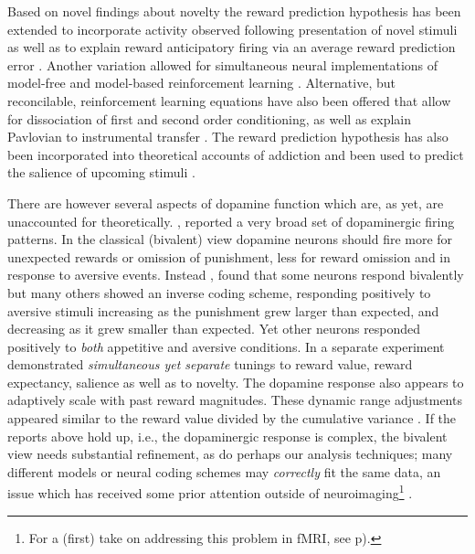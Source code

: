 Based on novel findings about novelty \cite{Bunzeck:2006p5319, Blatter:2006p6372, GuitartMasip:2010p7244} the reward prediction hypothesis has been extended to incorporate activity observed following presentation of novel stimuli \cite{Kakade:2002p6414} as well as to explain reward anticipatory firing via an average reward prediction error \cite{Knutson:2007p1687}. Another variation allowed for simultaneous neural implementations of model-free and model-based reinforcement learning \cite{Smith:2006p7627, Daw:2011p7995}. Alternative, but reconcilable, reinforcement learning equations have also been offered that allow for dissociation of first and second order conditioning, as well as explain Pavlovian to instrumental transfer \cite{OReilly:2007p827}. The reward prediction hypothesis has also been incorporated into theoretical accounts of addiction \cite{Redish:2004p2531} and been used to predict the salience of upcoming stimuli \cite{Behrens:2007p8839}.   

There are however several aspects of dopamine function which are, as yet, are unaccounted for theoretically.  , reported a very broad set of dopaminergic firing patterns. In the classical (bivalent) view dopamine neurons should fire more for unexpected rewards or omission of punishment, less for reward omission and in response to aversive events.   Instead , found that some neurons respond bivalently but many others showed an inverse coding scheme, responding positively to aversive stimuli increasing as the punishment grew larger than expected, and decreasing as it grew smaller than expected.  Yet other neurons responded positively to \emph{both} appetitive and aversive conditions.  In a separate experiment  demonstrated \emph{simultaneous yet separate} tunings to reward value, reward expectancy, salience as well as to novelty.   The dopamine response also appears to adaptively scale with past reward magnitudes.  These dynamic range adjustments appeared similar to the reward value divided by the cumulative variance \cite{Tobler:2005p6373}.  If the reports above hold up, i.e., the dopaminergic response is complex, the bivalent view needs substantial refinement, as do perhaps our analysis techniques; many different models or neural coding schemes may \emph{correctly} fit the same data, an issue which has received some prior attention outside of neuroimaging\footnote{
    For a (first) take on addressing this problem in fMRI, see p\pageref{subsub:tomany}).
} \cite{Chamberlin:1965p8873}.

